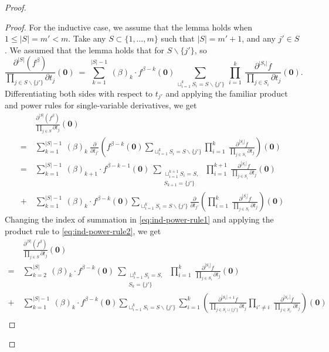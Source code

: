 \documentclass[12pt, reqno, oneside]{amsart}
\numberwithin{equation}{section}
\begin{document}
\begin{proof}
\begin{proof}
For the inductive case, we assume that the lemma holds when $1\leq|S|=m'<m$. Take any $S\subset\{1,\dots,m\}$ such that $|S|=m'+1$, and any $j'\in S$. We assumed that the lemma holds that for $S\backslash\{j'\}$, so 
\begin{equation}
\frac{\partial^{|S|} (f^\beta)}{\prod_{j \in S\backslash\{j'\}}\partial t_j}(\mathbf{0}) \ = \ \sum_{k=1}^{|S|-1} \ (\beta)_k \cdot f^{\beta-k}(\mathbf{0})\sum_{\sqcup_{i=1}^k S_i = S\backslash\{j'\}} \ \prod_{i=1}^k \ \frac{\partial^{|S_i|}f}{\prod_{j\in S_i}\partial t_j}(\mathbf{0}).
\end{equation}
Differentiating both sides with respect to $t_{j'}$ and applying the familiar product and power rules for single-variable derivatives, we get
\begin{align}
\nonumber
& \frac{\partial^{|S|} (f^\beta)}{\prod_{j \in S}\partial t_j}(\mathbf{0}) \\
\nonumber
= \ & 
\sum_{k=1}^{|S|-1} \ (\beta)_k \ \frac{\partial}{\partial t_{j'}}\left(f^{\beta-k}(\mathbf{0})\sum_{\sqcup_{i=1}^k S_i = S\backslash\{j'\}} \prod_{i=1}^k \ \frac{\partial^{|S_i|}f}{\prod_{j\in S_i}\partial t_j}\right)(\mathbf{0})\\
\label{eq:ind-power-rule1}
= \ & 
\sum_{k=1}^{|S|-1} \ (\beta)_{k+1} \cdot f^{\beta-k-1}(\mathbf{0}) \ \sum_{\substack{\sqcup_{i=1}^{k+1} S_i = S, \\ S_{k+1}=\{j'\}}} \ \prod_{i=1}^{k+1} \ \frac{\partial^{|S_i|}f}{\prod_{j\in S_i}\partial t_j}(\mathbf{0}) \\
\label{eq:ind-power-rule2}
+ \ & \sum_{k=1}^{|S|-1} \ (\beta)_k \cdot f^{\beta-k}(\mathbf{0})\sum_{\sqcup_{i=1}^k S_i = S\backslash\{j'\}} \frac{\partial}{\partial t_{j'}}\left(\prod_{i=1}^k \ \frac{\partial^{|S_i|}f}{\prod_{j\in S_i}\partial t_j}\right)(\mathbf{0})
\end{align}
Changing the index of summation in \eqref{eq:ind-power-rule1} and applying the product rule to \eqref{eq:ind-power-rule2}, we get
\begin{align}
\nonumber
& \frac{\partial^{|S|} (f^\beta)}{\prod_{j \in S}\partial t_j}(\mathbf{0}) \\
\nonumber
= \ & 
\sum_{k=2}^{|S|} \ (\beta)_k \cdot f^{\beta-k}(\mathbf{0}) \ \sum_{\substack{\sqcup_{i=1}^{k} S_i = S, \\ S_{k}=\{j'\}}} \ \prod_{i=1}^{k} \ \frac{\partial^{|S_i|}f}{\prod_{j\in S_i}\partial t_j}(\mathbf{0}) \\
\nonumber
+ \ & \sum_{k=1}^{|S|-1} \ (\beta)_k \cdot f^{\beta-k}(\mathbf{0})\sum_{\sqcup_{i=1}^k S_i = S\backslash\{j'\}} \sum_{i=1}^k \left(\frac{\partial^{|S_i|+1}f}{\prod\limits_{j\in S_i\cup\{j'\}}\partial t_j}\prod_{i'\neq i} \ \frac{\partial^{|S_{i'}|}f}{\prod_{j\in S_{i'}}\partial t_j}\right)(\mathbf{0}) \\

\end{align}
\end{proof}
\end{proof}
\end{document}
